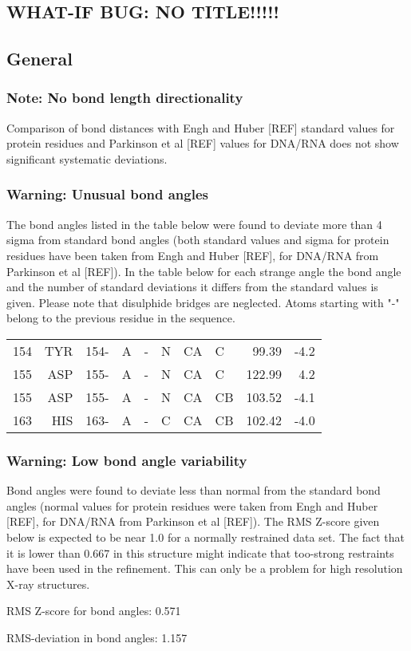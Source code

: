 \documentclass[a4paper]{article}
\def\showsect#1{
  \thesect\gdef\thesect{}
  \thessect\gdef\thessect{}
  \subsubsection{#1}
}
\gdef\thesect{\pagebreak[2]\section{WHAT-IF BUG: NO TITLE!!!!!}}
\gdef\thessect{\subsection{General}}
\begin{document}
\begin{note}
\showsect{Note: No bond length directionality}
Comparison of bond distances with Engh and Huber [REF] standard values for
protein residues and Parkinson et al [REF] values for DNA/RNA does not show
significant systematic deviations.
\end{note}

\begin{warning}
\showsect{Warning: Unusual bond angles}
The bond angles listed in the table below were found to deviate more than 4
sigma from standard bond angles (both standard values and sigma for protein
residues have been taken from Engh and Huber [REF], for DNA/RNA from
Parkinson et al [REF]). In the table below for each strange angle the bond
angle and the number of standard deviations it differs from the standard
values is given. Please note that disulphide bridges are neglected. Atoms
starting with "-" belong to the previous residue in the sequence.
 
\begin{center}
 
\begin{supertabular}{rr@{ (}r@{) }rllllrr}
  154&TYR & 154-&A &-  & N  & CA & C  & 99.39&  -4.2\\
  155&ASP & 155-&A &-  & N  & CA & C  &122.99&   4.2\\
  155&ASP & 155-&A &-  & N  & CA & CB &103.52&  -4.1\\
  163&HIS & 163-&A &-  & C  & CA & CB &102.42&  -4.0\\
\end{supertabular}\end{center}
\end{warning}

\begin{warning}
\showsect{Warning: Low bond angle variability}
Bond angles were found to deviate less than normal from the standard bond
angles (normal values for protein residues were taken from Engh and Huber
[REF], for DNA/RNA from Parkinson et al [REF]). The RMS Z-score given below
is expected to be near 1.0 for a normally restrained data set. The fact that
it is lower than 0.667 in this structure might indicate that too-strong
restraints have been used in the refinement. This can only be a problem for
high resolution X-ray structures.
 
\parbox{1\textwidth}{
 RMS Z-score for bond angles: 0.571
 
 RMS-deviation in bond angles: 1.157
}%
 
\end{warning}
\end{document}
